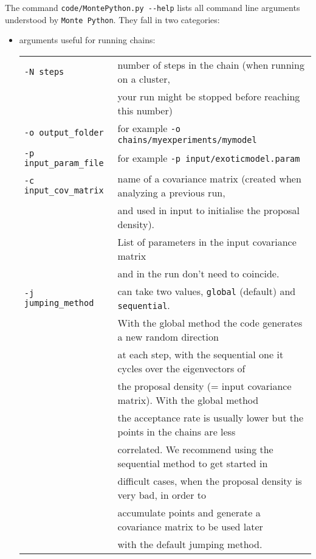 \documentclass[10pt]{article}
\newcommand{\MP}{\texttt{Monte Python}}
\begin{document}
The command \verb?code/MontePython.py --help? lists all command line arguments understood by \MP. They fall in two categories:
\begin{itemize}
\item arguments  useful for running chains:\\
\begin{tabular}{ll}
\verb?-N steps? & number of steps in the chain (when running on a cluster,\\& your run might be stopped before reaching this number)\\
\verb?-o output_folder? &for example \verb?-o chains/myexperiments/mymodel?\\
\verb?-p input_param_file?&for example \verb?-p input/exoticmodel.param?\\
\verb?-c input_cov_matrix?& name of a covariance matrix (created when analyzing a previous run,\\&and used in input to initialise the proposal density). \\&List of parameters in the input covariance matrix \\&and in the run don't need to coincide.\\
\verb?-j jumping_method? & can take two values, \verb?global? (default) and \verb?sequential?.\\& With the global method the code generates a new random direction \\& at each step, with the sequential one it cycles over the eigenvectors of \\&the proposal density (= input covariance matrix). With the global method\\& the acceptance rate is usually lower but the points in the chains are less\\& correlated.  We recommend using the sequential method to get started in\\& difficult cases, when the proposal density is very bad, in order to \\& accumulate points and generate a covariance matrix to be used later \\&with the default jumping method.\\

\end{tabular}
\end{itemize}
\end{document}
